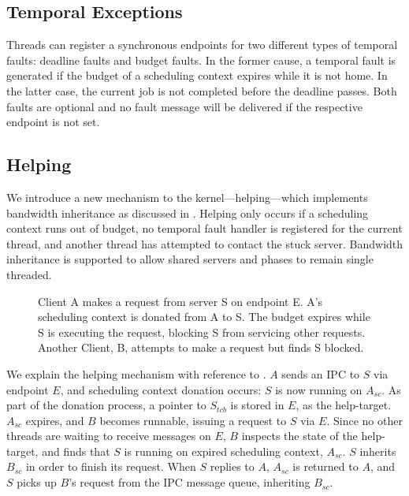 \subsection{Temporal Exceptions}

Threads can register a synchronous endpoints for two different types of temporal faults: deadline faults and budget faults.
In the former cause, a temporal fault is generated if the budget of a scheduling context expires while it is not home.
In the latter case, the current job is not completed before the deadline passes.
Both faults are optional and no fault message will be delivered if the respective endpoint is not set.

\subsection{Helping}

We introduce a new mechanism to the kernel---helping---which implements bandwidth inheritance as discussed in .
Helping only occurs if a scheduling context runs out of budget, no temporal fault handler is registered for the current thread, and another thread has attempted to contact the stuck server.
Bandwidth inheritance is supported to allow shared servers and phases to remain single threaded.

\begin{figure}
\centering
\caption{Client A makes a request from server S on endpoint E. A's scheduling context is donated from A to S. The budget expires while S is executing the request, blocking S from servicing other requests. Another Client, B, attempts to make a request but finds S blocked.}
\label{fig:budget-expiry}
\end{figure}

We explain the helping mechanism with reference to .
$A$ sends an IPC to $S$ via endpoint $E$, and scheduling context donation occurs: $S$ is now running on $A_{sc}$.
As part of the donation process, a pointer to $S_{tcb}$ is stored in $E$, as the help-target.
$A_{sc}$ expires, and $B$ becomes runnable, issuing a request to $S$ via $E$.
Since no other threads are waiting to receive messages on $E$, $B$ inspects the state of the help-target, and finds that $S$ is running on expired scheduling context, $A_{sc}$.
$S$ inherits $B_{sc}$ in order to finish its request.
When $S$ replies to $A$, $A_{sc}$ is returned to $A$, and $S$ picks up $B$'s request from the IPC message queue, inheriting $B_{sc}$.


